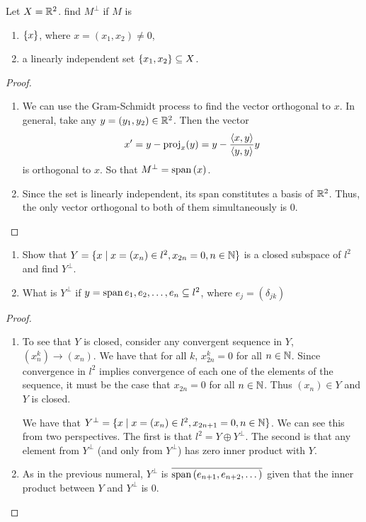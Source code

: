 \begin{exercise}{5}
Let $X=\mathbb{R}^2$.
find $M^\perp$ if $M$ is
\begin{enumerate}
    \item $\{x\}$, where $x = (x_1,x_2) \neq 0$,
    \item a linearly independent set $\{x_1,x_2\}\subseteq X$.
\end{enumerate}
\end{exercise}
\begin{proof}
\begin{enumerate}
    \item We can use the Gram-Schmidt process to find the vector orthogonal to $x$.
    In general, take any $y = (y_1,y_2)\in\mathbb{R}^2$.
    Then the vector
    \begin{align*}
        x' = y -\text{proj}_x(y) = y - \frac{\langle x,y\rangle}{\langle y,y\rangle}y
    \end{align*}
    is orthogonal to $x$.
    So that $M^\perp = \operatorname*{span}{(x)}$.
    \item Since the set is linearly independent, its span constitutes a basis of $\mathbb{R}^2$. 
    Thus, the only vector orthogonal to both of them simultaneously is 0.
\end{enumerate}
\end{proof}

\begin{exercise}{6}
\begin{enumerate}
    \item Show that $Y = \{x \mid x = (x_n) \in l^2, x_{2n}=0, n\in\mathbb{N}\}$ is a closed subspace of $l^2$ and find $Y^\perp$.
    \item What is $Y^\perp$ if $y = \operatorname*{span}{e_1, e_2, \dots, e_n} \subseteq l^2$, where $e_j = (\delta_{jk})$
\end{enumerate}
\end{exercise}
\begin{proof}
\begin{enumerate}
    \item To see that $Y$ is closed, consider any convergent sequence in $Y$, $(x_n^k) \to (x_n)$. 
    We have that for all $k$, $x_{2n}^k = 0$ for all $n\in\mathbb{N}$.
    Since convergence in $l^2$ implies convergence of each one of the elements of the sequence, it must be the case that $x_{2n} = 0$ for all $n\in\mathbb{N}$.
    Thus $(x_n) \in Y$ and $Y$ is closed.
    
    We have that $Y^\perp = \{x \mid x = (x_n) \in l^2, x_{2n+1}=0, n\in\mathbb{N}\}$.
    We can see this from two perspectives.
    The first is that $l^2 = Y \oplus Y^\perp$.
    The second is that any element from $Y^\perp$ (and only from $Y^\perp$) has zero inner product with $Y$.
    \item As in the previous numeral, $Y^\perp$ is $\overline{\operatorname*{span}{(e_{n+1}, e_{n+2},\dots)}}$ given that the inner product between $Y$ and $Y^\perp$ is 0.
\end{enumerate}
\end{proof}

